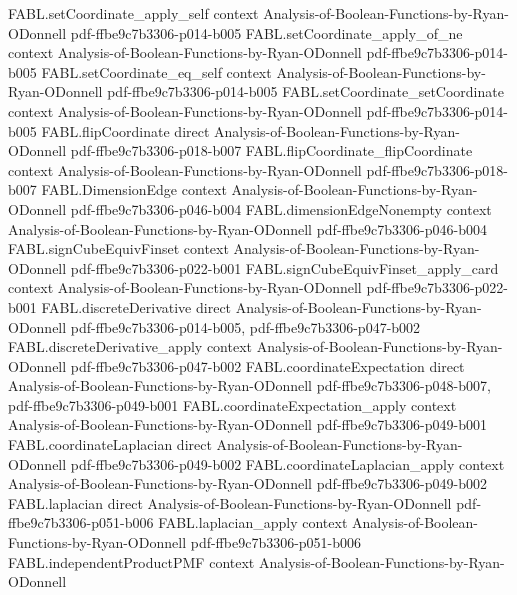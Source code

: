 \begin{theorem}
  {FABL.setCoordinate_apply_self}
  {context}
  {Analysis-of-Boolean-Functions-by-Ryan-ODonnell}
  {pdf-ffbe9c7b3306-p014-b005}
\proofstep
  {FABL.setCoordinate_apply_of_ne}
  {context}
  {Analysis-of-Boolean-Functions-by-Ryan-ODonnell}
  {pdf-ffbe9c7b3306-p014-b005}
\proofstep
  {FABL.setCoordinate_eq_self}
  {context}
  {Analysis-of-Boolean-Functions-by-Ryan-ODonnell}
  {pdf-ffbe9c7b3306-p014-b005}
\proofstep
  {FABL.setCoordinate_setCoordinate}
  {context}
  {Analysis-of-Boolean-Functions-by-Ryan-ODonnell}
  {pdf-ffbe9c7b3306-p014-b005}
\proofstep
  {FABL.flipCoordinate}
  {direct}
  {Analysis-of-Boolean-Functions-by-Ryan-ODonnell}
  {pdf-ffbe9c7b3306-p018-b007}
\proofstep
  {FABL.flipCoordinate_flipCoordinate}
  {context}
  {Analysis-of-Boolean-Functions-by-Ryan-ODonnell}
  {pdf-ffbe9c7b3306-p018-b007}
\proofstep
  {FABL.DimensionEdge}
  {context}
  {Analysis-of-Boolean-Functions-by-Ryan-ODonnell}
  {pdf-ffbe9c7b3306-p046-b004}
\proofstep
  {FABL.dimensionEdgeNonempty}
  {context}
  {Analysis-of-Boolean-Functions-by-Ryan-ODonnell}
  {pdf-ffbe9c7b3306-p046-b004}
\proofstep
  {FABL.signCubeEquivFinset}
  {context}
  {Analysis-of-Boolean-Functions-by-Ryan-ODonnell}
  {pdf-ffbe9c7b3306-p022-b001}
\proofstep
  {FABL.signCubeEquivFinset_apply_card}
  {context}
  {Analysis-of-Boolean-Functions-by-Ryan-ODonnell}
  {pdf-ffbe9c7b3306-p022-b001}
\proofstep
  {FABL.discreteDerivative}
  {direct}
  {Analysis-of-Boolean-Functions-by-Ryan-ODonnell}
  {pdf-ffbe9c7b3306-p014-b005,
    pdf-ffbe9c7b3306-p047-b002}
\proofstep
  {FABL.discreteDerivative_apply}
  {context}
  {Analysis-of-Boolean-Functions-by-Ryan-ODonnell}
  {pdf-ffbe9c7b3306-p047-b002}
\proofstep
  {FABL.coordinateExpectation}
  {direct}
  {Analysis-of-Boolean-Functions-by-Ryan-ODonnell}
  {pdf-ffbe9c7b3306-p048-b007,
    pdf-ffbe9c7b3306-p049-b001}
\proofstep
  {FABL.coordinateExpectation_apply}
  {context}
  {Analysis-of-Boolean-Functions-by-Ryan-ODonnell}
  {pdf-ffbe9c7b3306-p049-b001}
\proofstep
  {FABL.coordinateLaplacian}
  {direct}
  {Analysis-of-Boolean-Functions-by-Ryan-ODonnell}
  {pdf-ffbe9c7b3306-p049-b002}
\proofstep
  {FABL.coordinateLaplacian_apply}
  {context}
  {Analysis-of-Boolean-Functions-by-Ryan-ODonnell}
  {pdf-ffbe9c7b3306-p049-b002}
\proofstep
  {FABL.laplacian}
  {direct}
  {Analysis-of-Boolean-Functions-by-Ryan-ODonnell}
  {pdf-ffbe9c7b3306-p051-b006}
\proofstep
  {FABL.laplacian_apply}
  {context}
  {Analysis-of-Boolean-Functions-by-Ryan-ODonnell}
  {pdf-ffbe9c7b3306-p051-b006}
\proofstep
  {FABL.independentProductPMF}
  {context}
  {Analysis-of-Boolean-Functions-by-Ryan-ODonnell}

\end{theorem}
